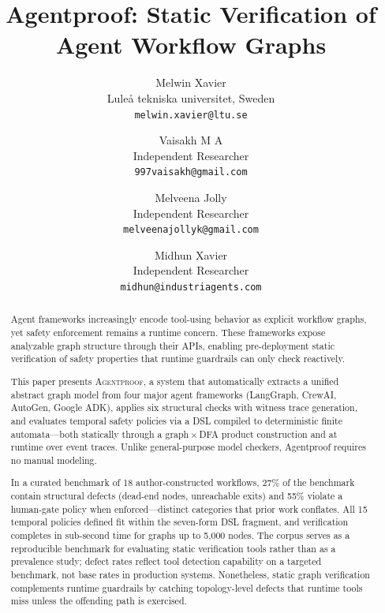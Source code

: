 \documentclass[11pt]{article}
\title{Agentproof: Static Verification of Agent Workflow Graphs}
\author{
  Melwin Xavier \\
  Lule\aa{} tekniska universitet, Sweden \\
  \texttt{melwin.xavier@ltu.se}
  \and
  Vaisakh M A \\
  Independent Researcher \\
  \texttt{997vaisakh@gmail.com}
  \and
  Melveena Jolly \\
  Independent Researcher \\
  \texttt{melveenajollyk@gmail.com}
  \and
  Midhun Xavier \\
  Independent Researcher \\
  \texttt{midhun@industriagents.com}
}
\date{}
\begin{document}
\maketitle

\begin{abstract}
Agent frameworks increasingly encode tool-using behavior as explicit
workflow graphs, yet safety enforcement remains a runtime concern.
These frameworks expose analyzable graph structure
through their APIs, enabling pre-deployment static verification of
safety properties that runtime guardrails can only check reactively.

This paper presents \textsc{Agentproof}, a system that automatically extracts a
unified abstract graph model from four major agent frameworks
(LangGraph, CrewAI, AutoGen, Google ADK), applies six structural
checks with witness trace generation, and evaluates temporal safety
policies via a DSL compiled to deterministic finite automata---both
statically through a graph\,$\times$\,DFA product construction and at
runtime over event traces. Unlike
general-purpose model checkers, Agentproof requires no manual modeling.

In a curated benchmark of 18 author-constructed workflows, 27\% of the
benchmark contain structural defects (dead-end nodes, unreachable exits)
and 55\% violate a human-gate policy when enforced---distinct categories
that prior work conflates. All 15 temporal policies defined fit within
the seven-form DSL fragment, and verification completes in sub-second
time for graphs up to 5{,}000 nodes. The corpus serves as a reproducible
benchmark for evaluating static verification tools rather than as a
prevalence study; defect rates reflect tool detection capability on a
targeted benchmark, not base rates in production systems. Nonetheless,
static graph verification complements runtime guardrails by catching
topology-level defects that runtime tools miss unless the offending path
is exercised.
\end{abstract}















\appendix


\end{document}
